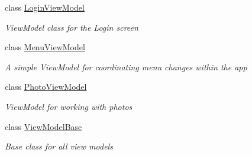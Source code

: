 \begin{DoxyCompactItemize}
class \hyperlink{class_field_service_1_1_view_models_1_1_login_view_model}{Login\+View\+Model}
\begin{DoxyCompactList}\small\item\em View\+Model class for the Login screen \end{DoxyCompactList}\item 
class \hyperlink{class_field_service_1_1_view_models_1_1_menu_view_model}{Menu\+View\+Model}
\begin{DoxyCompactList}\small\item\em A simple View\+Model for coordinating menu changes within the app \end{DoxyCompactList}\item 
class \hyperlink{class_field_service_1_1_view_models_1_1_photo_view_model}{Photo\+View\+Model}
\begin{DoxyCompactList}\small\item\em View\+Model for working with photos \end{DoxyCompactList}\item 
class \hyperlink{class_field_service_1_1_view_models_1_1_view_model_base}{View\+Model\+Base}
\begin{DoxyCompactList}\small\item\em Base class for all view models \end{DoxyCompactList}\end{DoxyCompactItemize}
